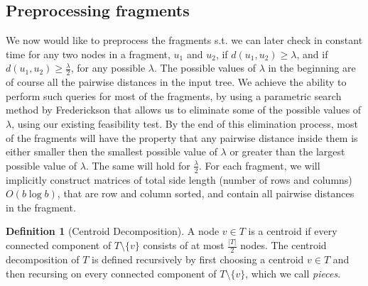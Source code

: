 \documentclass[11pt,a4paper]{article}
\theoremstyle{definition}
\newtheorem{definition}{Definition}
\theoremstyle{remark}
\begin{document}
\subsection{Preprocessing fragments} \label{Pre-Processing Fragments}
We now would like to preprocess the fragments s.t. we can later check in constant time for any two nodes in a fragment, $u_1$ and $u_2$, if $d(u_1,u_2)\geq\lambda$, and if $d(u_1,u_2) \geq \frac{\lambda}{2}$, for any possible $\lambda$. The possible values of $\lambda$ in the beginning are of course all the pairwise distances in the input tree. We achieve the ability to perform such queries for most of the fragments, by using a parametric search method by Frederickson that allows us to eliminate some of the possible values of $\lambda$, using our existing feasibility test. By the end of this elimination process, most of the fragments will have the property that any pairwise distance inside them is either smaller then the smallest possible value of $\lambda$ or
 greater than the largest possible value of $\lambda$. The same will hold for $\frac{\lambda}{2}$.
For each fragment, we will implicitly construct matrices of total side length (number of rows and columns) $O(b \log b)$, that are row and column sorted, and contain all pairwise distances in the fragment.

\begin{definition}[Centroid Decomposition]
A node $v\in T$ is a centroid if every connected component of $T\setminus\{v\}$ consists of at most $\frac{|T|}{2}$
nodes. The centroid decomposition of $T$ is defined recursively by first choosing a centroid $v\in T$
and then recursing on every connected component of $T\setminus\{v\}$, which we call \emph{pieces}.
\end{definition}
\end{document}
